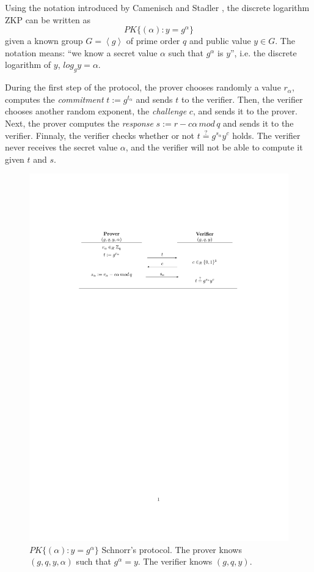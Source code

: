 Using the notation introduced by Camenisch and Stadler \cite{camenisch1997efficient}, the discrete logarithm ZKP can be written as 
\[ PK\{ (\alpha) : y = g^\alpha \}  \]
given a known group $G=\left\langle g \right\rangle $ of prime order $q$ and public value $y\in G$. The notation means: ``we know a secret value $\alpha$ such that $g^\alpha$ is $y$'', i.e. the discrete logarithm of $y$, $log_g y = \alpha$.


During the first step of the protocol, the prover chooses randomly a value $r_\alpha$, computes the \textit{commitment} $t := g^{t_\alpha}$ and sends $t$ to the verifier. 
Then, the verifier chooses another random exponent, the \textit{challenge} $c$, and sends it to the prover. 
Next, the prover computes the \textit{response} $s:=r-c\alpha\, mod\, q$ and sends it to the verifier.
Finnaly, the verifier checks whether or not $ t \overset{?}{=} g^{s_\alpha} y^c $ holds. The verifier never receives the secret value $\alpha$, and the verifier will not be able to compute it given $t$ and $s$.

\begin{figure}[bth]
	\includegraphics[width=\linewidth]{gfx/schnorr}
	\caption{$PK\{ (\alpha) : y = g^\alpha \}$ Schnorr's protocol. The prover knows $(g,q,y,\alpha)$ such that $g^\alpha=y$. The verifier knows $(g,q,y)$.}
	\label{fig:schnorr}
\end{figure}

